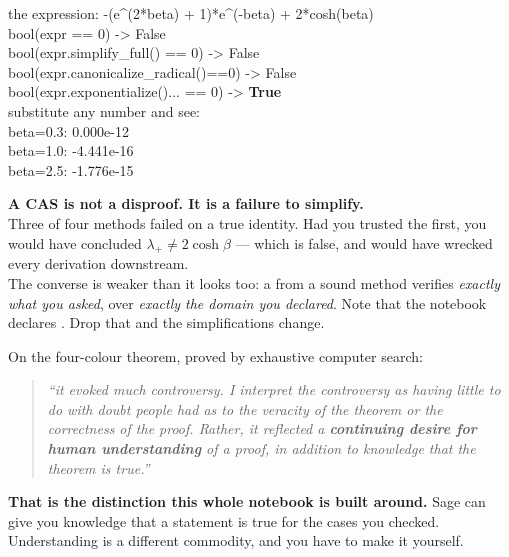 \begin{cellbox}
the expression: -(e\^{}(2*beta) + 1)*e\^{}(-beta) + 2*cosh(beta)\\[4pt]
\hspace*{2em}bool(expr == 0)                       -> False\\
\hspace*{2em}bool(expr.simplify\_full() == 0)       -> False\\
\hspace*{2em}bool(expr.canonicalize\_radical()==0)  -> False\\
\hspace*{2em}bool(expr.exponentialize()...  == 0)  -> \textcolor{bio}{\textbf{True}}\\[4pt]
substitute any number and see:\\
\hspace*{2em}beta=0.3:  0.000e-12\\
\hspace*{2em}beta=1.0: -4.441e-16\\
\hspace*{2em}beta=2.5: -1.776e-15
\end{cellbox}

\begin{warnbox}[title={The moral, stated precisely}]
\textbf{A CAS  is not a disproof. It is a failure to simplify.}\\[4pt]
Three of four methods failed on a true identity. Had you trusted the first, you would have concluded
$\lambda_+\neq2\cosh\beta$ --- which is false, and would have wrecked every derivation downstream.\\[5pt]
The converse is weaker than it looks too: a  from a sound method verifies \emph{exactly what
you asked}, over \emph{exactly the domain you declared}. Note that the notebook declares
. Drop that and the simplifications change.
\end{warnbox}

\begin{bookbox}[title={Thurston saw this coming, in 1994}]
On the four-colour theorem, proved by exhaustive computer search:
\begin{quote}\itshape
``it evoked much controversy. I interpret the controversy as having little to do with doubt people
had as to the veracity of the theorem or the correctness of the proof. Rather, it reflected a
\textbf{continuing desire for human understanding} of a proof, in addition to knowledge that the
theorem is true.''
\end{quote}
\textbf{That is the distinction this whole notebook is built around.} Sage can give you knowledge
that a statement is true for the cases you checked. Understanding is a different commodity, and you
have to make it yourself.
\end{bookbox}
